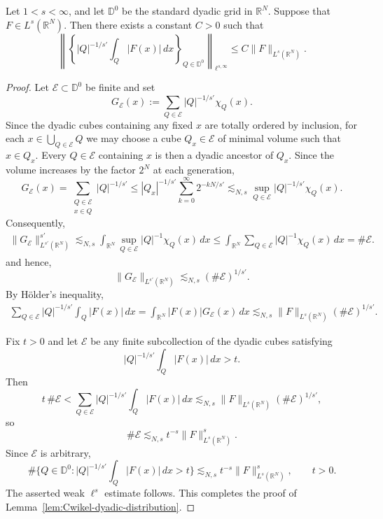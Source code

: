 \documentclass{amsart}
\begin{document}
\begin{lemma}\label{lem:Cwikel-dyadic-distribution}
Let $1<s<\infty$, and let $\mathbb D^0$ be the standard dyadic grid
in $\mathbb R^N$. Suppose that
$
F\in L^s(\mathbb R^N).
$
Then there exists a constant $C>0$ such that
\[
\left\|\left\{|Q|^{-1/s'}\int_Q |F(x)|\,dx\right\}_{Q\in\mathbb D^0}\right\|_{\ell^{s,\infty}}
\leq C
\|F\|_{L^s(\mathbb R^N)}.
\]
\end{lemma}
\begin{proof}
Let $\mathcal E\subset\mathbb D^0$ be finite and set
\[
G_{\mathcal E}(x)
:=
\sum_{Q\in\mathcal E}|Q|^{-1/s'}\chi_Q(x).
\]
Since the dyadic cubes containing any fixed $x$ are totally ordered by inclusion, for each
$x\in\bigcup_{Q\in\mathcal E}Q$ we may choose a cube $Q_x\in\mathcal E$ of minimal volume such that $x\in Q_x$. Every $Q\in\mathcal E$ containing $x$ is then a dyadic ancestor of $Q_x$. Since the volume increases by the factor $2^N$ at each generation,
\[
G_{\mathcal E}(x)
=
\sum_{\substack{Q\in\mathcal E\\ x\in Q}}|Q|^{-1/s'}
\leq
|Q_x|^{-1/s'}
\sum_{k=0}^{\infty}2^{-kN/s'}
\lesssim_{N,s}
\sup_{Q\in\mathcal E}|Q|^{-1/s'}\chi_Q(x).
\]
Consequently,
\begin{align*}
\|G_{\mathcal E}\|_{L^{s'}(\mathbb R^N)}^{s'}
\lesssim_{N,s}
\int_{\mathbb R^N}
\sup_{Q\in\mathcal E}|Q|^{-1}\chi_Q(x)\,dx\leq
\int_{\mathbb R^N}
\sum_{Q\in\mathcal E}|Q|^{-1}\chi_Q(x)\,dx
=
\#\mathcal E.
\end{align*}
and hence,
\[
\|G_{\mathcal E}\|_{L^{s'}(\mathbb R^N)}
\lesssim_{N,s}
(\#\mathcal E)^{1/s'}.
\]
By H\"older's inequality,
\begin{align*}
\sum_{Q\in\mathcal E}|Q|^{-1/s'}\int_Q|F(x)|\,dx
=
\int_{\mathbb R^N}|F(x)|G_{\mathcal E}(x)\,dx\lesssim_{N,s}
\|F\|_{L^s(\mathbb R^N)}(\#\mathcal E)^{1/s'}.
\end{align*}

Fix $t>0$ and let $\mathcal E$ be any finite subcollection of the dyadic cubes satisfying
\[
|Q|^{-1/s'}\int_Q|F(x)|\,dx>t.
\]
Then
\[
t\,\#\mathcal E
<
\sum_{Q\in\mathcal E}|Q|^{-1/s'}\int_Q|F(x)|\,dx
\lesssim_{N,s}
\|F\|_{L^s(\mathbb R^N)}(\#\mathcal E)^{1/s'},
\]
so
\[
\#\mathcal E
\lesssim_{N,s}
t^{-s}\|F\|_{L^s(\mathbb R^N)}^s.
\]
Since $\mathcal E$ is arbitrary,
\[
\#\Bigg\{
Q\in\mathbb D^0:
|Q|^{-1/s'}\int_Q|F(x)|\,dx>t
\Bigg\}
\lesssim_{N,s}
t^{-s}\|F\|_{L^s(\mathbb R^N)}^s,
\qquad t>0.
\]
The asserted weak $\ell^s$ estimate follows. This completes the proof of Lemma~\ref{lem:Cwikel-dyadic-distribution}.
\end{proof}




\end{document}
